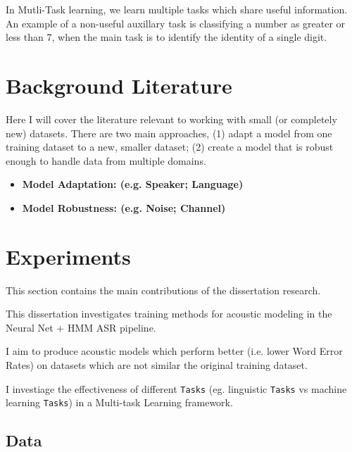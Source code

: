 \documentclass[10pt,a4paper]{article}
\begin{document}
In Mutli-Task learning, we learn multiple tasks which share useful information. An example of a non-useful auxillary task is classifying a number as greater or less than 7, when the main task is to identify the identity of a single digit.






\newpage

\section{Background Literature}

Here I will cover the literature relevant to working with small (or completely new) datasets. There are two main approaches, (1) adapt a model from one training dataset to a new, smaller dataset; (2) create a model that is robust enough to handle data from multiple domains. 

\begin{itemize}

\item \textbf{Model Adaptation: (e.g. Speaker; Language)}

    
  
\item \textbf{Model Robustness: (e.g. Noise; Channel)}

  
\end{itemize}



\newpage

\section{Experiments}

This section contains the main contributions of the dissertation research.

This dissertation investigates training methods for acoustic modeling in the Neural Net + HMM ASR pipeline.

I aim to produce acoustic models which perform better (i.e. lower Word Error Rates) on datasets which are not similar the original training dataset.

I investiage the effectiveness of different \texttt{Tasks} (eg. linguistic \texttt{Tasks} vs machine learning \texttt{Tasks}) in a Multi-task Learning framework.


\subsection{Data}
\end{document}
